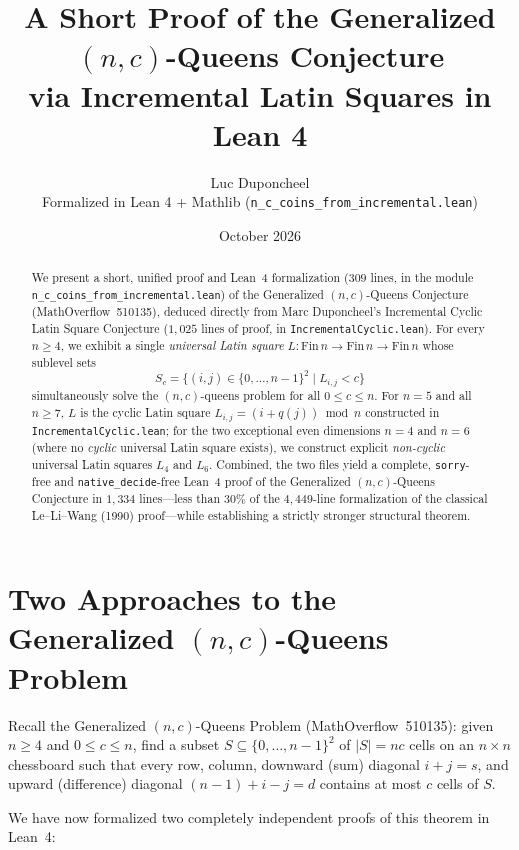 \documentclass[11pt,a4paper]{article}
\title{\textbf{A Short Proof of the Generalized $(n,c)$-Queens Conjecture\\
via Incremental Latin Squares in Lean 4}}
\author{Luc Duponcheel \\ \small Formalized in Lean 4 + Mathlib (\texttt{n\_c\_coins\_from\_incremental.lean})}
\date{October 2026}
\theoremstyle{remark}
\begin{document}
\maketitle

\begin{abstract}
We present a short, unified proof and Lean~4 formalization ($309$ lines, in the module \texttt{n\_c\_coins\_from\_incremental.lean}) of the Generalized $(n,c)$-Queens Conjecture (MathOverflow~510135), deduced directly from Marc Duponcheel's Incremental Cyclic Latin Square Conjecture ($1{,}025$ lines of proof, in \texttt{IncrementalCyclic.lean}). For every $n \ge 4$, we exhibit a single \emph{universal Latin square} $L : \mathrm{Fin}\,n \to \mathrm{Fin}\,n \to \mathrm{Fin}\,n$ whose sublevel sets
\[
  S_c = \{(i, j) \in \{0, \dots, n-1\}^2 \mid L_{i,j} < c\}
\]
simultaneously solve the $(n,c)$-queens problem for all $0 \le c \le n$. For $n = 5$ and all $n \ge 7$, $L$ is the cyclic Latin square $L_{i,j} = (i + q(j)) \bmod n$ constructed in \texttt{IncrementalCyclic.lean}; for the two exceptional even dimensions $n = 4$ and $n = 6$ (where no \emph{cyclic} universal Latin square exists), we construct explicit \emph{non-cyclic} universal Latin squares $L_4$ and $L_6$. Combined, the two files yield a complete, \texttt{sorry}-free and \texttt{native\_decide}-free Lean~4 proof of the Generalized $(n,c)$-Queens Conjecture in $1{,}334$ lines---less than $30\%$ of the $4{,}449$-line formalization of the classical Le--Li--Wang (1990) proof---while establishing a strictly stronger structural theorem.
\end{abstract}

\tableofcontents

\section{Two Approaches to the Generalized \texorpdfstring{$(n,c)$}{(n,c)}-Queens Problem}

Recall the Generalized $(n,c)$-Queens Problem (MathOverflow~510135): given $n \ge 4$ and $0 \le c \le n$, find a subset $S \subseteq \{0, \dots, n-1\}^2$ of $|S| = nc$ cells on an $n \times n$ chessboard such that every row, column, downward (sum) diagonal $i + j = s$, and upward (difference) diagonal $(n - 1) + i - j = d$ contains at most $c$ cells of $S$.

We have now formalized two completely independent proofs of this theorem in Lean~4:
\end{document}

